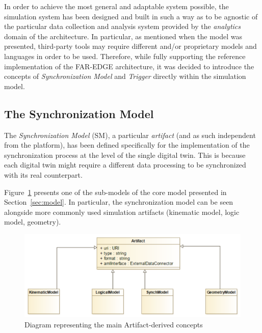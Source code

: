 In order to achieve the most general and adaptable system possible, the simulation system has been designed and built in such a way as to be agnostic of the particular data collection and analysis system provided by the \textit{analytics} domain of the architecture. In particular, as mentioned when the model was presented, third-party tools may require different and/or proprietary models and languages in order to be used. Therefore, while fully supporting the reference implementation of the FAR-EDGE architecture, it was decided to introduce the concepts of \textit{Synchronization Model} and \textit{Trigger} directly within the simulation model. 

\subsection{The Synchronization Model}
The \textit{Synchronization Model} (SM), a particular \textit{artifact} (and as such independent from the platform), has been defined specifically for the implementation of the synchronization process at the level of the single digital twin.
This is because each digital twin might require a different data processing  to be synchronized with its real counterpart. 

Figure~\ref{fig:sm-diagram} presents one of the sub-models of the core model presented in Section~\ref{sec:model}. In particular, the synchronization model can be seen alongside more commonly used simulation artifacts (kinematic model, logic model, geometry). 


\begin{figure}
	\centering
	\includegraphics[width=0.9\linewidth]{images/sm-artifact.png}
	\caption{Diagram representing the main Artifact-derived concepts}
	\label{fig:sm-diagram}
\end{figure}

